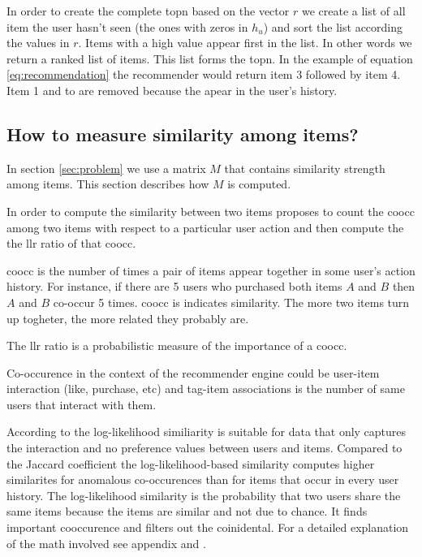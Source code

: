 In order to create the complete \gls{topn} based on the vector $r$ we create a list of all item the user hasn't seen (the ones with zeros in $h_u$) and sort the list according the values in $r$. Items with a high value appear first in the list. In other words we return a ranked list of items. This list forms the \gls{topn}. In the example of equation \ref{eq:recommendation} the recommender would return item 3 followed by item 4. Item 1 and to are removed because the apear in the user's history.

\subsection{How to measure similarity among items?}
\label{sec:llr}

In section \ref{sec:problem} we use a matrix $M$ that contains similarity strength among items. This section describes how $M$ is computed.

In order to compute the similarity between two items \cite{Dunning14} proposes to count the \gls{coocc} among two items with respect to a particular user action and then compute the the \gls{llr} ratio of that \gls{coocc}.

\gls{coocc} is the number of times a pair of items appear together in some user's action history. For instance, if there are 5 users who purchased both items $A$ and $B$ then $A$ and $B$ co-occur 5 times. \gls{coocc} is indicates similarity. The more two items turn up togheter, the more related they probably are.

The \gls{llr} ratio is a probabilistic measure of the importance of a \gls{coocc}. 

Co-occurence in the context of the recommender engine could be user-item interaction (like, purchase, etc) and tag-item associations is the number of same users that interact with them.

According to \cite{Dunning93} the log-likelihood similiarity is suitable for data that only captures the interaction and no preference values between users and items. 
Compared to the Jaccard coefficient \cite{Hartung} the log-likelihood-based similarity computes higher similarites for anomalous co-occurences than for items that occur in every user history. The log-likelihood similarity  is the probability that two users share the same items because the items are similar and not due to chance. It finds important cooccurence and filters out the coinidental. For a detailed explanation of the math involved see appendix and \cite{Dunning93}. 

